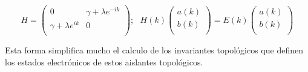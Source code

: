 \begin{equation}
    \label{eq:Hamiltonian_ssh_bloch}
    H =      
     \begin{pmatrix}
            0 & \gamma + \lambda e^{-ik}  \\
            \gamma + \lambda e^{ik} & 0  \\
        \end{pmatrix} ; \,\,\,\, H(k) \begin{pmatrix}
            a(k)   \\
            b(k)  \\
        \end{pmatrix} = E(k) \begin{pmatrix}
            a(k)   \\
            b(k)  \\
        \end{pmatrix}
\end{equation}

Esta forma simplifica mucho el calculo de los invariantes topológicos que definen los estados electrónicos de estos aislantes topológicos.


